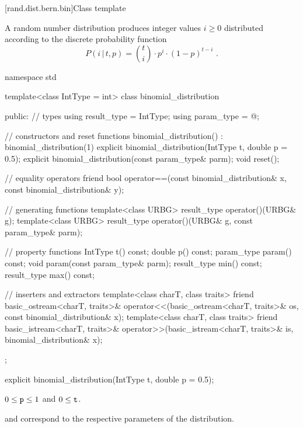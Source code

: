 
[rand.dist.bern.bin]{Class template }%
%

\pnum
A  random number distribution
produces integer values $i \geq 0$
distributed according to
the discrete probability function%
\[ P(i\,|\,t,p) = \binom{t}{i} \cdot p^i \cdot (1-p)^{t-i} \text{ .} \]

%
%
\begin{codeblock}
namespace std {
  template<class IntType = int>
  class binomial_distribution {
  public:
    // types
    using result_type = IntType;
    using param_type  = @\unspec@;

    // constructors and reset functions
    binomial_distribution() : binomial_distribution(1) {}
    explicit binomial_distribution(IntType t, double p = 0.5);
    explicit binomial_distribution(const param_type& parm);
    void reset();

    // equality operators
    friend bool operator==(const binomial_distribution& x, const binomial_distribution& y);

    // generating functions
    template<class URBG>
      result_type operator()(URBG& g);
    template<class URBG>
      result_type operator()(URBG& g, const param_type& parm);

    // property functions
    IntType t() const;
    double p() const;
    param_type param() const;
    void param(const param_type& parm);
    result_type min() const;
    result_type max() const;

    // inserters and extractors
    template<class charT, class traits>
      friend basic_ostream<charT, traits>&
        operator<<(basic_ostream<charT, traits>& os, const binomial_distribution& x);
    template<class charT, class traits>
      friend basic_istream<charT, traits>&
        operator>>(basic_istream<charT, traits>& is, binomial_distribution& x);
  };
}
\end{codeblock}


%
\begin{itemdecl}
explicit binomial_distribution(IntType t, double p = 0.5);
\end{itemdecl}

\begin{itemdescr}
\pnum
\expects
$0 \leq \texttt{\protect p} \leq 1$ and $0 \leq \texttt{\protect t} $.

\pnum
\remarks
  and 
 correspond to the respective parameters of the distribution.
\end{itemdescr}

